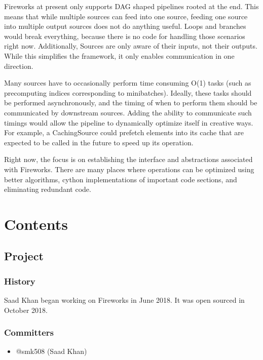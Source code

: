 \documentclass[letterpaper,10pt,english]{sphinxmanual}
\begin{document}
Fireworks at present only supports DAG shaped pipelines rooted at the end. This means that while multiple sources can feed into one source, feeding one source into multiple output sources does not do anything useful. Loops and branches would break everything, because there is no code for handling those scenarios right now. Additionally, Sources are only aware of their inputs, not their outputs. While this simplifies the framework, it only enables communication in one direction.


Many sources have to occasionally perform time consuming O(1) tasks (such as precomputing indices corresponding to minibatches). Ideally, these tasks should be performed asynchronously, and the timing of when to perform them should be communicated by downstream sources. Adding the ability to communicate such timings would allow the pipeline to dynamically optimize itself in creative ways. For example, a CachingSource could prefetch elements into its cache that are expected to be called in the future to speed up its operation.


Right now, the focus is on establishing the interface and abstractions associated with Fireworks. There are many places where operations can be optimized using better algorithms, cython implementations of important code sections, and eliminating redundant code.


\chapter{Contents}
\label{\detokenize{index:contents}}

\section{Project}
\label{\detokenize{Project:project}}\label{\detokenize{Project::doc}}

\subsection{History}
\label{\detokenize{Project:history}}
Saad Khan began working on Fireworks in June 2018. It was open sourced in October 2018.


\subsection{Committers}
\label{\detokenize{Project:committers}}\begin{itemize}
\item {} 
@smk508 (Saad Khan)

\end{itemize}
\end{document}
